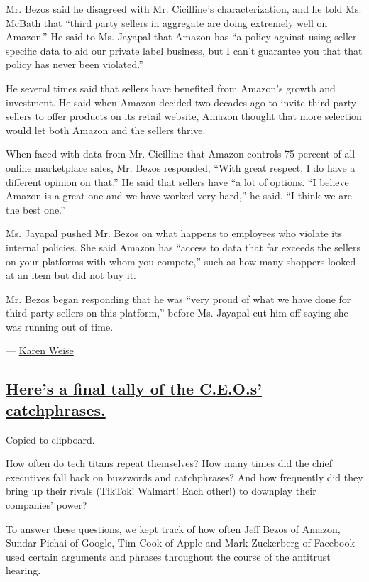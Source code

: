 Mr. Bezos said he disagreed with Mr. Cicilline's characterization, and
he told Ms. McBath that ``third party sellers in aggregate are doing
extremely well on Amazon.'' He said to Ms. Jayapal that Amazon has ``a
policy against using seller-specific data to aid our private label
business, but I can't guarantee you that that policy has never been
violated.''

He several times said that sellers have benefited from Amazon's growth
and investment. He said when Amazon decided two decades ago to invite
third-party sellers to offer products on its retail website, Amazon
thought that more selection would let both Amazon and the sellers
thrive.

When faced with data from Mr. Cicilline that Amazon controls 75 percent
of all online marketplace sales, Mr. Bezos responded, ``With great
respect, I do have a different opinion on that.'' He said that sellers
have ``a lot of options. ``I believe Amazon is a great one and we have
worked very hard,'' he said. ``I think we are the best one.''

Ms. Jayapal pushed Mr. Bezos on what happens to employees who violate
its internal policies. She said Amazon has ``access to data that far
exceeds the sellers on your platforms with whom you compete,'' such as
how many shoppers looked at an item but did not buy it.

Mr. Bezos began responding that he was ``very proud of what we have done
for third-party sellers on this platform,'' before Ms. Jayapal cut him
off saying she was running out of time.

--- \href{https://www.nytimes3xbfgragh.onion/by/karen-weise}{Karen
Weise}

\hypertarget{heres-a-final-tally-of-the-ceos-catchphrases}{%
\subsection{\texorpdfstring{\protect\hyperlink{what-ceos-said}{Here's a
final tally of the C.E.O.s'
catchphrases.}}{Here's a final tally of the C.E.O.s' catchphrases.}}\label{heres-a-final-tally-of-the-ceos-catchphrases}}

Copied to clipboard.

How often do tech titans repeat themselves? How many times did the chief
executives fall back on buzzwords and catchphrases? And how frequently
did they bring up their rivals (TikTok! Walmart! Each other!) to
downplay their companies' power?

To answer these questions, we kept track of how often Jeff Bezos of
Amazon, Sundar Pichai of Google, Tim Cook of Apple and Mark Zuckerberg
of Facebook used certain arguments and phrases throughout the course of
the antitrust hearing.

